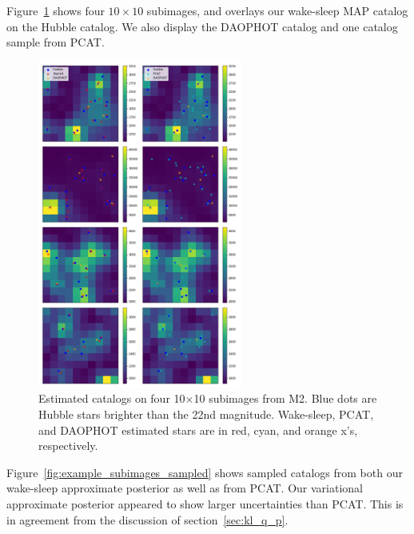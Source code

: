 Figure~\ref{fig:example_subimages} shows four $10\times10$ subimages, and overlays our wake-sleep MAP catalog on the Hubble catalog. We also display the DAOPHOT catalog and one catalog sample from PCAT.

\begin{figure}[ht]
    \centering
    \includegraphics[width=0.6\textwidth]{figures/example_subimages.png}
    \caption{Estimated catalogs on four 10$\times$10 subimages from
    M2. Blue dots are Hubble stars brighter than the 22nd magnitude.
    Wake-sleep, PCAT, and DAOPHOT estimated stars are in
    red, cyan, and orange x's, respectively. }
    \label{fig:example_subimages}
\end{figure}


Figure~\ref{fig:example_subimages_sampled} shows sampled catalogs from both our wake-sleep approximate posterior as well as from PCAT.
Our variational approximate posterior appeared to show larger uncertainties
than PCAT. This is in agreement from the discussion of section~\ref{sec:kl_q_p}. 


